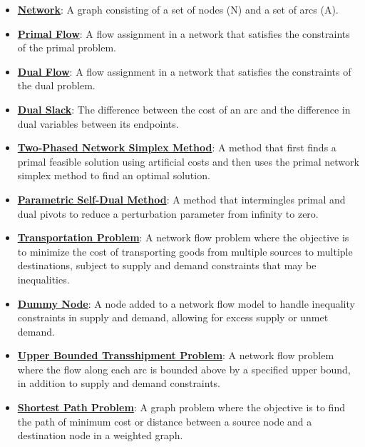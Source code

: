 \documentclass{article}%
\begin{document}
\begin{itemize}[leftmargin=*]
\item \href{https://www.math.purdue.edu/~yipn/421/2024-11-07-NetSimplex.pdf#page=1}{\textbf{Network}}: A graph consisting of a set of nodes (N) and a set of arcs (A).%
\item \href{https://www.math.purdue.edu/~yipn/421/2024-11-07-NetSimplex.pdf#page=2}{\textbf{Primal Flow}}: A flow assignment in a network that satisfies the constraints of the primal problem.%
\item \href{https://www.math.purdue.edu/~yipn/421/2024-11-07-NetSimplex.pdf#page=3}{\textbf{Dual Flow}}: A flow assignment in a network that satisfies the constraints of the dual problem.%
\item \href{https://www.math.purdue.edu/~yipn/421/2024-11-07-NetSimplex.pdf#page=3}{\textbf{Dual Slack}}: The difference between the cost of an arc and the difference in dual variables between its endpoints.%
\item \href{https://www.math.purdue.edu/~yipn/421/2024-11-07-NetSimplex.pdf#page=45}{\textbf{Two-Phased Network Simplex Method}}: A method that first finds a primal feasible solution using artificial costs and then uses the primal network simplex method to find an optimal solution.%
\item \href{https://www.math.purdue.edu/~yipn/421/2024-11-07-NetSimplex.pdf#page=45}{\textbf{Parametric Self-Dual Method}}: A method that intermingles primal and dual pivots to reduce a perturbation parameter from infinity to zero.%
\item \href{https://www.math.purdue.edu/~yipn/421/2024-11-14-NetAppls.pdf#page=1}{\textbf{Transportation Problem}}: A network flow problem where the objective is to minimize the cost of transporting goods from multiple sources to multiple destinations, subject to supply and demand constraints that may be inequalities.%
\item \href{https://www.math.purdue.edu/~yipn/421/2024-11-14-NetAppls.pdf#page=3}{\textbf{Dummy Node}}: A node added to a network flow model to handle inequality constraints in supply and demand, allowing for excess supply or unmet demand.%
\item \href{https://www.math.purdue.edu/~yipn/421/2024-11-14-NetAppls.pdf#page=9}{\textbf{Upper Bounded Transshipment Problem}}: A network flow problem where the flow along each arc is bounded above by a specified upper bound, in addition to supply and demand constraints.%
\item \href{https://www.math.purdue.edu/~yipn/421/2024-11-14-NetAppls.pdf#page=13}{\textbf{Shortest Path Problem}}: A graph problem where the objective is to find the path of minimum cost or distance between a source node and a destination node in a weighted graph.%

\end{itemize}
\end{document}
